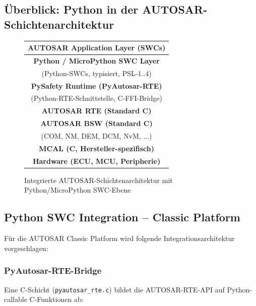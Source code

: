 ﻿\documentclass[12pt,a4paper,twoside]{article}
\begin{document}
\subsection{Überblick: Python in der AUTOSAR-Schichtenarchitektur}
\label{subsec:schichten}

\begin{figure}[h]
\centering
\begin{tabular}{|c|}
\hline
\rowcolor{autosarblue!30}
\textbf{AUTOSAR Application Layer (SWCs)} \\
\hline
\rowcolor{pythonblue!20}
\textbf{Python / MicroPython SWC Layer} \\
(Python-SWCs, typisiert, PSL-1..4) \\
\hline
\rowcolor{pythonblue!10}
\textbf{PySafety Runtime (PyAutosar-RTE)} \\
(Python-RTE-Schnittstelle, C-FFI-Bridge) \\
\hline
\rowcolor{gray!20}
\textbf{AUTOSAR RTE (Standard C)} \\
\hline
\rowcolor{gray!10}
\textbf{AUTOSAR BSW (Standard C)} \\
(COM, NM, DEM, DCM, NvM, ...) \\
\hline
\rowcolor{gray!5}
\textbf{MCAL (C, Hersteller-spezifisch)} \\
\hline
\rowcolor{lightgray}
\textbf{Hardware (ECU, MCU, Peripherie)} \\
\hline
\end{tabular}
\caption{Integrierte AUTOSAR-Schichtenarchitektur mit Python/MicroPython SWC-Ebene}
\label{fig:architektur}
\end{figure}

\subsection{Python SWC Integration -- Classic Platform}
\label{subsec:cp_integration}

Für die AUTOSAR Classic Platform wird folgende Integrationsarchitektur vorgeschlagen:

\subsubsection{PyAutosar-RTE-Bridge}
Eine C-Schicht (\texttt{pyautosar\_rte.c}) bildet die AUTOSAR-RTE-API
auf Python-callable C-Funktionen ab:
\end{document}
